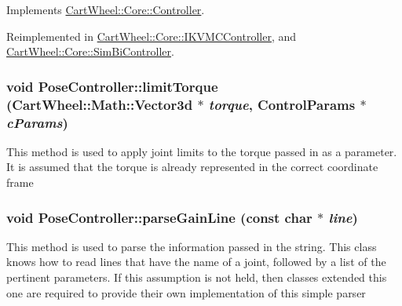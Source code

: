 Implements \hyperlink{classCartWheel_1_1Core_1_1Controller_a4355027883ca8a1be4048d95577b8e74}{CartWheel::Core::Controller}.



Reimplemented in \hyperlink{classCartWheel_1_1Core_1_1IKVMCController_a0a944ad3c3178ecc74488c1697460883}{CartWheel::Core::IKVMCController}, and \hyperlink{classCartWheel_1_1Core_1_1SimBiController_aa6510698f1e27b154ace8e9459080322}{CartWheel::Core::SimBiController}.

\hypertarget{classCartWheel_1_1Core_1_1PoseController_a07dec65d047addfddec390f15ade136c}{
\subsubsection[{limitTorque}]{\setlength{\rightskip}{0pt plus 5cm}void PoseController::limitTorque ({\bf CartWheel::Math::Vector3d} $\ast$ {\em torque}, \/  {\bf ControlParams} $\ast$ {\em cParams})}}
\label{classCartWheel_1_1Core_1_1PoseController_a07dec65d047addfddec390f15ade136c}
This method is used to apply joint limits to the torque passed in as a parameter. It is assumed that the torque is already represented in the correct coordinate frame \hypertarget{classCartWheel_1_1Core_1_1PoseController_ad05d09982370d04e508b54bebf7ba8a1}{
\subsubsection[{parseGainLine}]{\setlength{\rightskip}{0pt plus 5cm}void PoseController::parseGainLine (const char $\ast$ {\em line})}}
\label{classCartWheel_1_1Core_1_1PoseController_ad05d09982370d04e508b54bebf7ba8a1}
This method is used to parse the information passed in the string. This class knows how to read lines that have the name of a joint, followed by a list of the pertinent parameters. If this assumption is not held, then classes extended this one are required to provide their own implementation of this simple parser 

